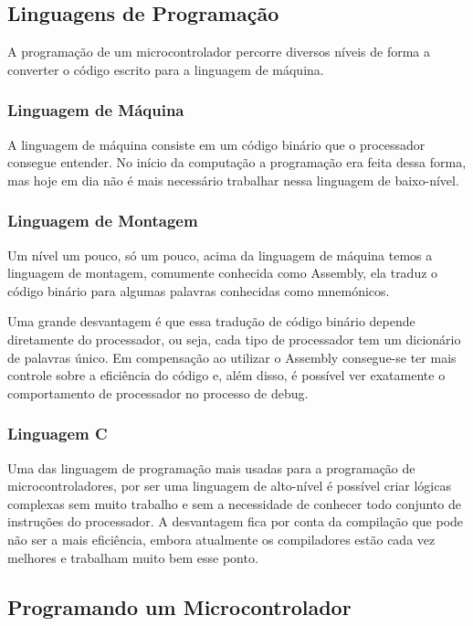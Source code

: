 \subsection{Linguagens de Programação}

A programação de um microcontrolador percorre diversos níveis de forma a converter o código escrito para a linguagem de máquina.

\subsubsection*{Linguagem de Máquina}

A linguagem de máquina consiste em um código binário que o processador consegue entender. No início da computação a programação era feita dessa forma, mas hoje em dia não é mais necessário trabalhar nessa linguagem de baixo-nível.

\subsubsection*{Linguagem de Montagem}

Um nível um pouco, só um pouco, acima da linguagem de máquina temos a linguagem de montagem, comumente conhecida como Assembly, ela traduz o código binário para algumas palavras conhecidas como mnemónicos.

Uma grande desvantagem é que essa tradução de código binário depende diretamente do processador, ou seja, cada tipo de processador tem um dicionário de palavras único. Em compensação ao utilizar o Assembly consegue-se ter mais controle sobre a eficiência do código e, além disso, é possível ver exatamente o comportamento de processador no processo de debug.

\subsubsection*{Linguagem C}

Uma das linguagem de programação mais usadas para a programação de microcontroladores, por ser uma linguagem de alto-nível é possível criar lógicas complexas sem muito trabalho e sem a necessidade de conhecer todo conjunto de instruções do processador.
A desvantagem fica por conta da compilação que pode não ser a mais eficiência, embora atualmente os compiladores estão cada vez melhores e trabalham muito bem esse ponto.

\subsection{Programando um Microcontrolador}


